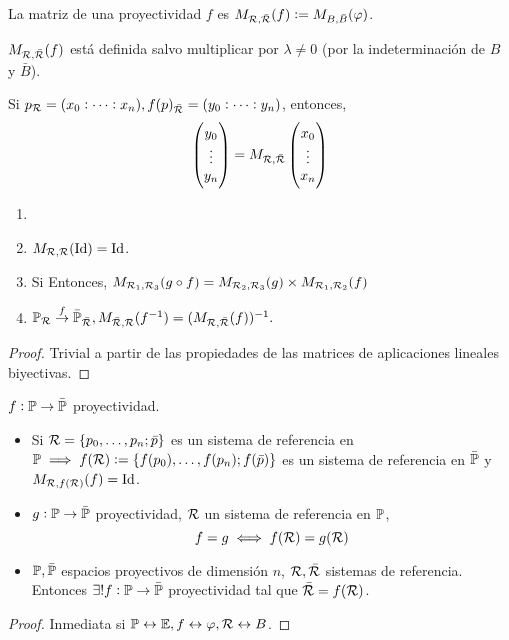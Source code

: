 \begin{defi}
	La matriz de una proyectividad $f$ es $M_{\mathcal{R}, \bar{\mathcal{R}}} (f) := M_{B, \bar{B}}(\varphi)$.
\end{defi}
\begin{obs}
	$M_{\mathcal{R}, \bar{\mathcal{R}}} (f)$ está definida salvo multiplicar por $\lambda \neq 0$ (por la indeterminación de $B$ y $\bar{B}$).
\end{obs}
\begin{obs}
	Si $p_{\mathcal{R}} = (x_0 : \dots : x_n), f(p)_{\bar{\mathcal{R}}} = (y_0 : \dots : y_n)$, entonces,
	\[
	\begin{pmatrix} y_0 \\ \vdots \\ y_n \end{pmatrix} = M_{\mathcal{R}, \bar{\mathcal{R}}} \begin{pmatrix} x_0 \\ \vdots \\ x_n \end{pmatrix}
	\]
\end{obs}
\begin{prop}[Propiedades]
	\begin{enumerate}
		\item[]
		\item $M_{\mathcal{R}, \mathcal{R}}(\operatorname{Id}) = \operatorname{Id}$.
		\item Si
			Entonces, $M_{\mathcal{R}_1, \mathcal{R}_3}(g \circ f) = M_{\mathcal{R}_2, \mathcal{R}_3}(g) \times M_{\mathcal{R}_1, \mathcal{R}_2}(f)$
		\item $\mathbb{P}_{\mathcal{R}} \stackrel{f}{\to} \bar{\mathbb{P}}_{\bar{\mathcal{R}}}, M_{\bar{\mathcal{R}}, \mathcal{R}}(f^{-1}) = (M_{\mathcal{R}, \bar{\mathcal{R}}} (f))^{-1}.$
	\end{enumerate}
\end{prop}
\begin{proof}
	Trivial a partir de las propiedades de las matrices de aplicaciones lineales biyectivas.
\end{proof}
\begin{prop}
	$f : \mathbb{P} \to \bar{\mathbb{P}}$ proyectividad.
	\begin{itemize}
		\item Si $\mathcal{R} = \{p_0, \dots, p_n; \bar{p}\}$ es un sistema de referencia en $\mathbb{P} \implies f(\mathcal{R}) := \{f(p_0), \dots, f(p_n); f(\bar{p})\}$ es un sistema de referencia en $\bar{\mathbb{P}}$ y $M_{\mathcal{R}, f(\mathcal{R})}(f) = \operatorname{Id}$.
		\item $g : \mathbb{P} \to \bar{\mathbb{P}}$ proyectividad, $\mathcal{R}$ un sistema de referencia en $\mathbb{P}$,
			\[
				f = g \iff f(\mathcal{R}) = g(\mathcal{R})
			\]
		\item $\mathbb{P}, \bar{\mathbb{P}}$ espacios proyectivos de dimensión $n$, $\mathcal{R}, \bar{\mathcal{R}}$ sistemas de referencia. Entonces $\exists! f : \mathbb{P} \to \bar{\mathbb{P}}$ proyectividad tal que $\bar{\mathcal{R}} = f(\mathcal{R})$.
	\end{itemize}
\end{prop}
\begin{proof}
	Inmediata si $\mathbb{P} \leftrightarrow \mathbb{E}, f \leftrightarrow \varphi, \mathcal{R} \leftrightarrow B$.
\end{proof}

